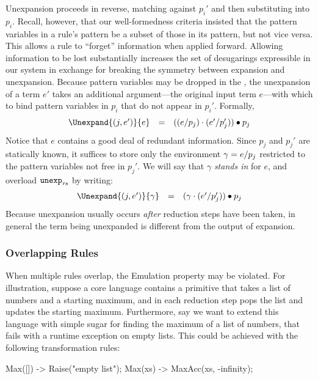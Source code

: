 Unexpansion proceeds in reverse, matching against $p_i'$ and then
substituting into $p_i$. Recall, however, that our well-formedness
criteria insisted that the pattern variables in a rule's  pattern be a
subset of those in its  pattern, but not vice versa. This allows a
rule to ``forget'' information when applied forward. Allowing information
to be lost substantially increases the set of desugarings expressible in
our system in exchange for breaking the symmetry between expansion and
unexpansion. Because pattern variables may be dropped in the , the
unexpansion of a term $e'$ takes an additional argument---the original
input term $e$---with which to bind pattern variables in $p_i$ that do not
appear in $p_i'$. Formally,
\[\begin{array}{lllll}
  \Unexpand{(j, e')}{e} &=&
    ((e \match p_j) \cdot (e' \match p_j')) \subs p_j
\end{array}\]
Notice that $e$ contains a good deal of redundant
information. Since $p_j$ and $p_j'$ are statically known, it
suffices to store only the environment $\gamma = e / p_j$
restricted to the pattern variables not free in $p_j'$. We will say that $\gamma$
\emph{stands in} for $e$, and overload $\texttt{unexp}_{\mathit{rs}}$ by writing:
\[\begin{array}{lllll}
  \Unexpand{(j, e')}{\gamma} &=&
    (\gamma \cdot (e' \match p_j')) \subs p_j
\end{array}\]
Because unexpansion usually occurs \emph{after} reduction steps have
been taken, in general the term being unexpanded is different
from the output of expansion.


\subsubsection{Overlapping Rules}
\label{sec:reval-overlapping}

When multiple rules overlap, the Emulation property may be violated.
For illustration,
suppose a core language contains a  primitive
that takes a list of numbers and a starting maximum, and in each reduction
step pops the list and updates the starting maximum. Furthermore, say
we want to extend this language with simple sugar for finding the maximum
of a list of numbers, that fails with a runtime exception on empty
lists. This could be achieved with the following transformation rules:
\begin{Codes}
Max([]) -> Raise("empty list");
Max(xs) -> MaxAcc(xs, -infinity);
\end{Codes}

